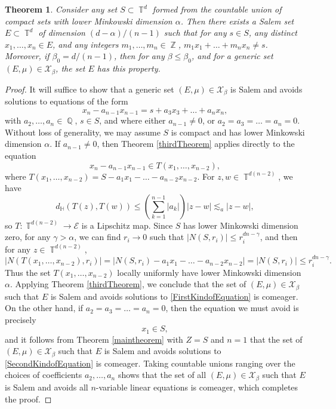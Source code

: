 \documentclass[dvipsnames,letterpaper,12pt]{article}
\numberwithin{equation}{section}
\DeclareMathOperator{\ZZ}{\mathbb{Z}}
\DeclareMathOperator{\QQ}{\mathbb{Q}}
\DeclareMathOperator{\TT}{\mathbb{T}}
\newtheorem{theorem}{Theorem}
\numberwithin{theorem}{section}
\begin{document}
\begin{theorem} \label{dDimensionalKornerResult}
    Consider any set $S \subset \TT^d$ formed from the countable union of compact sets with lower Minkowski dimension $\alpha$. Then there exists a Salem set $E \subset \TT^d$ of dimension $(d - \alpha)/(n-1)$ such that for any $s \in S$, any distinct $x_1,\dots,x_n \in E$, and any integers $m_1,\dots,m_n \in \ZZ$, $m_1x_1 + \dots + m_nx_n \neq s$. Moreover, if $\beta_0 = d/(n-1)$, then for any $\beta \leq \beta_0$, and for a generic set $(E,\mu) \in \mathcal{X}_\beta$, the set $E$ has this property.
\end{theorem}
\begin{proof}
    It will suffice to show that a generic set $(E,\mu) \in \mathcal{X}_\beta$ is Salem and avoids solutions to equations of the form
    \begin{equation} \label{equationOIDJDIOJOIJ2131232143fdfef}
        x_n - a_{n-1} x_{n-1} = s + a_3x_3 + \dots + a_nx_n,
    \end{equation}
    with $a_2,\dots,a_n \in \QQ$, $s \in S$, and where either $a_{n-1} \neq 0$, or $a_2 = a_3 = \dots = a_n = 0$. Without loss of generality, we may assume $S$ is compact and has lower Minkowski dimension $\alpha$. If $a_{n-1} \neq 0$, then Theorem \ref{thirdTheorem} applies directly to the equation
    \begin{equation} \label{FirstKindofEquation}
        x_n - a_{n-1} x_{n-1} \in T(x_1,\dots,x_{n-2}),
    \end{equation}
    where $T(x_1,\dots,x_{n-2}) = S - a_1x_1 - \dots - a_{n-2}x_{n-2}$. For $z,w \in \TT^{d(n-2)}$, we have
    \[ d_{\mathbb{H}}( T(z), T(w) ) \leq \left( \sum_{k = 1}^{n-1} |a_k| \right) |z - w| \lesssim_a |z - w|, \]
    so $T: \TT^{d(n-2)} \to \mathcal{E}$ is a Lipschitz map. Since $S$ has lower Minkowski dimension zero, for any $\gamma > \alpha$, we can find $r_i \to 0$ such that $|N(S,r_i)| \leq r_i^{dn-\gamma}$, and then for any $z \in \TT^{d(n-2)}$,
    \[ |N(T(x_1,\dots,x_{n-2}),r_i)| = |N(S,r_i) - a_1x_1 - \dots - a_{n-2}x_{n-2}| = |N(S,r_i)| \leq r_i^{dn-\gamma}. \]
    Thus the set $T(x_1,\dots,x_{n-2})$ locally uniformly have lower Minkowski dimension $\alpha$. Applying Theorem \ref{thirdTheorem}, we conclude that the set of $(E,\mu) \in \mathcal{X}_\beta$ such that $E$ is Salem and avoids solutions to \eqref{FirstKindofEquation} is comeager. On the other hand, if $a_2 = a_3 = \dots = a_n = 0$, then the equation we must avoid is precisely
    \begin{equation} \label{SecondKindofEquation}
        x_1 \in S,
    \end{equation}
    and it follows from Theorem \ref{maintheorem} with $Z = S$ and $n = 1$ that the set of $(E,\mu) \in \mathcal{X}_\beta$ such that $E$ is Salem and avoids solutions to \eqref{SecondKindofEquation} is comeager. Taking countable unions ranging over the choices of coefficients $a_2,\dots,a_n$ shows that the set of all $(E,\mu) \in \mathcal{X}_\beta$ such that $E$ is Salem and avoids all $n$-variable linear equations is comeager, which completes the proof.
\end{proof}
\end{document}

